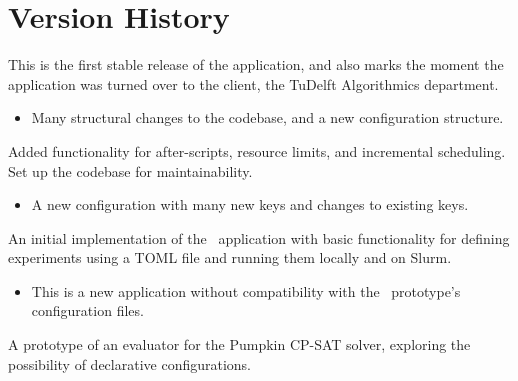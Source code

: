 \pagebreak

\section{Version History}





This is the first stable release of the application,
and also marks the moment the application was turned over
to the client, the TuDelft Algorithmics department.

\breakingchanges
\begin{itemize}
\item Many structural changes to the codebase, and a
  new configuration structure.
\end{itemize}


Added functionality for after-scripts, resource limits,
and incremental scheduling.
Set up the codebase for maintainability.

\breakingchanges
\begin{itemize}
\item A new configuration with many new keys and
changes to existing keys.
\end{itemize}


An initial implementation of the \gourdtest\ application
with basic functionality for defining experiments using a
TOML file and running them locally and on Slurm.

\breakingchanges
\begin{itemize}
\item This is a new application without compatibility with
the \gourdtest\ prototype's configuration files.
\end{itemize}


A prototype of an evaluator for the Pumpkin CP-SAT solver,
exploring the possibility of declarative configurations.

\clearpage
